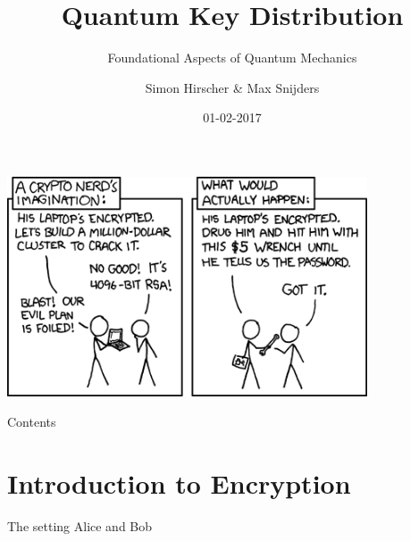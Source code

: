 \documentclass{beamer}
\title{Quantum Key Distribution}
\subtitle{Foundational Aspects of Quantum Mechanics}
\date{01-02-2017}
\author[Hirscher, Snijders]{Simon Hirscher \& Max Snijders}
\begin{document}
	\begin{frame}
		\begin{center}
		\includegraphics[width=0.8\textwidth]{images/xkcd-security.png}
		\end{center}
	\end{frame}

	\begin{frame}
		\titlepage
	\end{frame}

	\begin{frame}{Contents} %
		\tableofcontents
	\end{frame}

	\section{Introduction to Encryption}
	\begin{frame}{The setting}
		Alice and Bob
	\end{frame}
\end{document}
